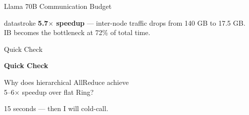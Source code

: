 \documentclass[aspectratio=169, 12pt]{beamer}
\begin{document}
\begin{frame}{Llama 70B Communication Budget}
\vspace{0.1cm}
\begin{mlsyscard}{datastroke}
\textbf{5.7$\times$ speedup} --- inter-node traffic drops from 140 GB to 17.5 GB. IB becomes the bottleneck at 72\% of total time.
\end{mlsyscard}

\end{frame}

\begin{frame}{Quick Check}

\centering
\vspace{1.0cm}
{\Large\bfseries Quick Check}

\vspace{0.6cm}
{\large Why does hierarchical AllReduce achieve\\5--6$\times$ speedup over flat Ring?}

\vspace{0.5cm}
{\normalsize\textcolor{midgray}{15 seconds --- then I will cold-call.}}

\end{frame}
\end{document}
